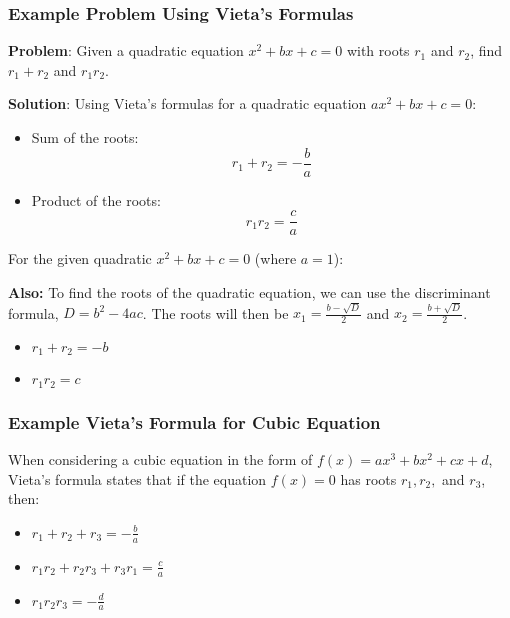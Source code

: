         \subsubsection*{Example Problem Using Vieta's Formulas}

        \textbf{Problem}: Given a quadratic equation \(x^2 + bx + c = 0\) with roots \(r_1\) and \(r_2\), find \(r_1 + r_2\) and \(r_1r_2\).

        \textbf{Solution}:
        Using Vieta's formulas for a quadratic equation \(ax^2 + bx + c = 0\):

        \begin{itemize}
            \item Sum of the roots:
            \[
            r_1 + r_2 = -\frac{b}{a}
            \]
            \item Product of the roots:
            \[
            r_1r_2 = \frac{c}{a}
            \]
        \end{itemize}

        For the given quadratic \(x^2 + bx + c = 0\) (where \(a = 1\)):

        \textbf{Also:}
        To find the roots of the quadratic equation, we can use the discriminant formula, \( D = b^2 - 4ac \). The roots will then be \( x_1 = \frac{b - \sqrt{D}}{2} \) and \( x_2 = \frac{b + \sqrt{D}}{2} \).


        \begin{itemize}
            \item \(r_1 + r_2 = -b\)
            \item \(r_1r_2 = c\)
        \end{itemize}

        \subsubsection*{Example Vieta's Formula for Cubic Equation}

        When considering a cubic equation in the form of \( f(x) = ax^3 + bx^2 + cx + d \), Vieta's formula states that if the equation \( f(x) = 0 \) has roots \( r_1, r_2, \) and \( r_3 \), then:

        \begin{itemize}
            \item \( r_1 + r_2 + r_3 = -\frac{b}{a} \)
            \item \( r_1r_2 + r_2r_3 + r_3r_1 = \frac{c}{a} \)
            \item \( r_1r_2r_3 = -\frac{d}{a} \)
        \end{itemize}